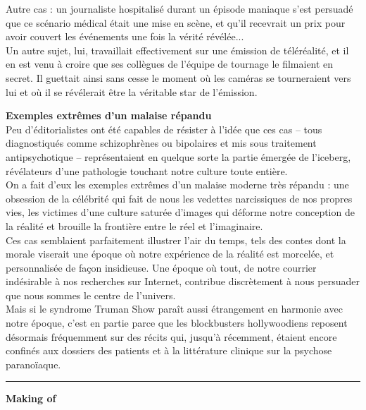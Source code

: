 \documentclass[11pt,twoside,a4paper]{article}
\begin{document}
Autre cas : un journaliste hospitalis{\'e} durant un {\'e}pisode maniaque s'est persuad{\'e} que ce sc{\'e}nario m{\'e}dical {\'e}tait une mise en sc{\`e}ne, et qu'il recevrait un prix pour avoir couvert les {\'e}v{\'e}nements une fois la v{\'e}rit{\'e} r{\'e}v{\'e}l{\'e}e... ~\\

Un autre sujet, lui, travaillait effectivement sur une {\'e}mission de t{\'e}l{\'e}r{\'e}alit{\'e}, et il en est venu {\`a} croire que ses coll{\`e}gues de l'{\'e}quipe de tournage le filmaient en secret. Il guettait ainsi sans cesse le moment o{\`u} les cam{\'e}ras se tourneraient vers lui et o{\`u} il se r{\'e}v{\'e}lerait {\^e}tre la v{\'e}ritable star de l'{\'e}mission. ~\\

\begin{minipage}[ht]{0.65\textwidth}
	\textbf{\Large Exemples extr{\^e}mes d'un malaise r{\'e}pandu}~\\
	
	Peu d'{\'e}ditorialistes ont {\'e}t{\'e} capables de r{\'e}sister {\`a} l'id{\'e}e que ces cas -- tous diagnostiqu{\'e}s comme schizophr{\`e}nes ou bipolaires et mis sous traitement antipsychotique -- repr{\'e}sentaient en quelque sorte la partie {\'e}merg{\'e}e de l'iceberg, r{\'e}v{\'e}lateurs d'une pathologie touchant notre culture toute enti{\`e}re.~\\
	
	On a fait d'eux les exemples extr{\^e}mes d'un malaise moderne tr{\`e}s r{\'e}pandu : une obsession de la c{\'e}l{\'e}brit{\'e} qui fait de nous les vedettes narcissiques de nos propres vies, les victimes d'une culture satur{\'e}e d'images qui d{\'e}forme notre conception de la r{\'e}alit{\'e} et brouille la fronti{\`e}re entre le r{\'e}el et l'imaginaire.~\\
	
	Ces cas semblaient parfaitement illustrer l'air du temps, tels des contes dont la morale viserait une {\'e}poque o{\`u} notre exp{\'e}rience de la r{\'e}alit{\'e} est morcel{\'e}e, et personnalis{\'e}e de fa\c{c}on insidieuse. Une {\'e}poque o{\`u} tout, de notre courrier ind{\'e}sirable {\`a} nos recherches sur Internet, contribue discr{\`e}tement {\`a} nous persuader que nous sommes le centre de l'univers.~\\
	
	Mais si le syndrome Truman Show para{\^i}t aussi {\'e}trangement en harmonie avec notre {\'e}poque, c'est en partie parce que les blockbusters hollywoodiens reposent d{\'e}sormais fr{\'e}quemment sur des r{\'e}cits qui, jusqu'{\`a} r{\'e}cemment, {\'e}taient encore confin{\'e}s aux dossiers des patients et {\`a} la litt{\'e}rature clinique sur la psychose parano{\"i}aque.~\\
\end{minipage} \hfill \begin{minipage}[ht]{0.33\textwidth}
	\small
	\hrule
	\textbf{\large Making of}~\\
	

\end{minipage}
\end{document}
